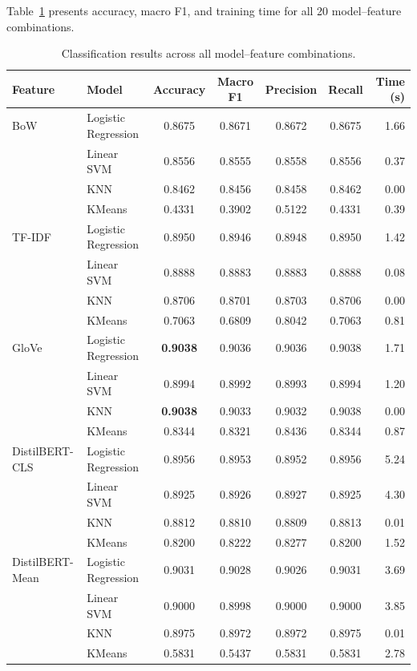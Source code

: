 \documentclass[11pt, a4paper, twocolumn]{article}
\begin{document}
Table~\ref{tab:main} presents accuracy, macro F1, and training time for all 20 model--feature combinations.

\begin{table}[t]
\centering
\caption{Classification results across all model--feature combinations.}
\label{tab:main}
\small
\begin{tabular}{ll cccc r}
\toprule
\textbf{Feature} & \textbf{Model} & \textbf{Accuracy} & \textbf{Macro F1} & \textbf{Precision} & \textbf{Recall} & \textbf{Time (s)} \\
\midrule
  BoW & Logistic Regression & 0.8675 & 0.8671 & 0.8672 & 0.8675 & 1.66 \\
   & Linear SVM & 0.8556 & 0.8555 & 0.8558 & 0.8556 & 0.37 \\
   & KNN & 0.8462 & 0.8456 & 0.8458 & 0.8462 & 0.00 \\
   & KMeans & 0.4331 & 0.3902 & 0.5122 & 0.4331 & 0.39 \\
\midrule
  TF-IDF & Logistic Regression & 0.8950 & 0.8946 & 0.8948 & 0.8950 & 1.42 \\
   & Linear SVM & 0.8888 & 0.8883 & 0.8883 & 0.8888 & 0.08 \\
   & KNN & 0.8706 & 0.8701 & 0.8703 & 0.8706 & 0.00 \\
   & KMeans & 0.7063 & 0.6809 & 0.8042 & 0.7063 & 0.81 \\
\midrule
  GloVe & Logistic Regression & \textbf{0.9038} & 0.9036 & 0.9036 & 0.9038 & 1.71 \\
   & Linear SVM & 0.8994 & 0.8992 & 0.8993 & 0.8994 & 1.20 \\
   & KNN & \textbf{0.9038} & 0.9033 & 0.9032 & 0.9038 & 0.00 \\
   & KMeans & 0.8344 & 0.8321 & 0.8436 & 0.8344 & 0.87 \\
\midrule
  DistilBERT-CLS & Logistic Regression & 0.8956 & 0.8953 & 0.8952 & 0.8956 & 5.24 \\
   & Linear SVM & 0.8925 & 0.8926 & 0.8927 & 0.8925 & 4.30 \\
   & KNN & 0.8812 & 0.8810 & 0.8809 & 0.8813 & 0.01 \\
   & KMeans & 0.8200 & 0.8222 & 0.8277 & 0.8200 & 1.52 \\
\midrule
  DistilBERT-Mean & Logistic Regression & 0.9031 & 0.9028 & 0.9026 & 0.9031 & 3.69 \\
   & Linear SVM & 0.9000 & 0.8998 & 0.9000 & 0.9000 & 3.85 \\
   & KNN & 0.8975 & 0.8972 & 0.8972 & 0.8975 & 0.01 \\
   & KMeans & 0.5831 & 0.5437 & 0.5831 & 0.5831 & 2.78 \\
\bottomrule
\end{tabular}
\end{table}
\end{document}

